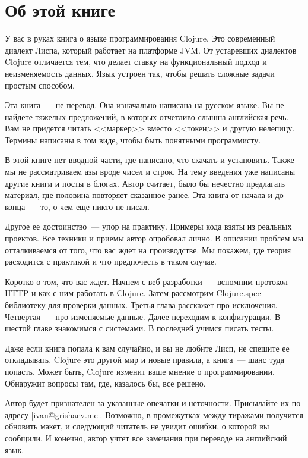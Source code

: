 \chapter*{Об этой книге}

У вас в руках книга о языке программирования Clojure. Это современный диалект
Лиспа, который работает на платформе JVM. От устаревших диалектов Clojure
отличается тем, что делает ставку на функциональный подход и неизменяемость
данных. Язык устроен так, чтобы решать сложные задачи простым способом.

Эта книга~--- не перевод. Она изначально написана на русском языке. Вы не
найдете тяжелых предложений, в которых отчетливо слышна английская речь. Вам не
придется читать <<маркер>> вместо <<токен>> и другую нелепицу. Термины написаны
в том виде, чтобы быть понятными программисту.

В этой книге нет вводной части, где написано, что скачать и установить. Также мы
не рассматриваем азы вроде чисел и строк. На тему введения уже написаны другие
книги и посты в блогах. Автор считает, было бы нечестно предлагать материал, где
половина повторяет сказанное ранее. Эта книга от начала и до конца~--- то, о чем
еще никто не писал.

Другое ее достоинство~--- упор на практику. Примеры кода взяты из реальных
проектов. Все техники и приемы автор опробовал лично. В описании проблем мы
отталкиваемся от того, что вас ждет на производстве. Мы покажем, где теория
расходится с практикой и что предпочесть в таком случае.

Коротко о том, что вас ждет. Начнем с веб-разработки~--- вспомним протокол HTTP
и как с ним работать в Clojure. Затем рассмотрим Clojure.spec~--- библиотеку для
проверки данных. Третья глава расскажет про исключения. Четвертая~--- про
изменяемые данные. Далее переходим к конфигурации. В шестой главе знакомимся с
системами. В последней учимся писать тесты.

Даже если книга попала к вам случайно, и вы не любите Лисп, не спешите ее
откладывать. Clojure это другой мир и новые правила, а книга~--- шанс туда
попасть. Может быть, Clojure изменит ваше мнение о программировании. Обнаружит
вопросы там, где, казалось бы, все решено.

Автор будет признателен за указанные опечатки и неточности. Присылайте их по
адресу \spverb|ivan@grishaev.me|. Возможно, в промежутках между тиражами
получится обновить макет, и следующий читатель не увидит ошибки, о которой вы
сообщили. И конечно, автор учтет все замечания при переводе на английский язык.

